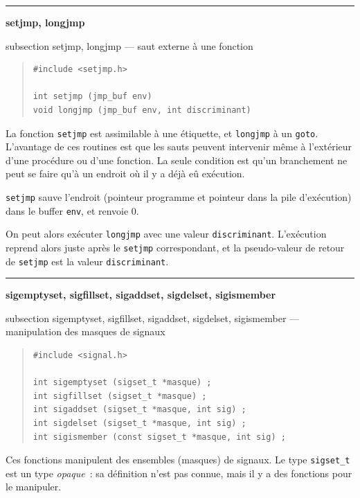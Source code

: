 \documentclass [twoside] {report}
\newcommand {\primitive} [1]
    {
	\phantomsection
	{\large \textbf {#1}}
	\addcontentsline {toc} {subsection} {#1}
    }
\newcommand {\separation}
    {
	\vspace {5mm}
	\nopagebreak
	\hrule
    }
\begin{document}
\separation 
\primitive {setjmp, longjmp} --- saut externe à une fonction

\begin {quote}
\begin {verbatim}
#include <setjmp.h>

int setjmp (jmp_buf env)
void longjmp (jmp_buf env, int discriminant)
\end{verbatim}
\end {quote}

La fonction \texttt {setjmp} est assimilable à une étiquette, et
\texttt {longjmp} à un \texttt {goto}. L'avantage de ces routines est que
les sauts peuvent intervenir même à l'extérieur d'une
procédure ou d'une fonction. La seule condition est qu'un
branchement ne peut se faire qu'à un endroit où il y a déjà
eû exécution.

\texttt {setjmp} sauve l'endroit (pointeur programme et pointeur
dans la pile d'exécution) dans le buffer \texttt {env}, et renvoie
0.

On peut alors exécuter \texttt {longjmp} avec une valeur
\texttt {discriminant}. L'exécution reprend alors juste après le
\texttt {setjmp} correspondant, et la pseudo-valeur de retour de
\texttt {setjmp} est la valeur \texttt {discriminant}.





\separation 
\primitive {sigemptyset, sigfillset, sigaddset, sigdelset, sigismember} ---
manipulation des masques de signaux
    \label {sigsetopts}

\begin {quote}
\begin {verbatim}
#include <signal.h>

int sigemptyset (sigset_t *masque) ;
int sigfillset (sigset_t *masque) ;
int sigaddset (sigset_t *masque, int sig) ;
int sigdelset (sigset_t *masque, int sig) ;
int sigismember (const sigset_t *masque, int sig) ;
\end{verbatim}
\end {quote}

Ces fonctions manipulent des ensembles (masques) de signaux.  Le type
\texttt {sigset\_t} est un type \emph {opaque}~:  sa définition n'est pas
connue, mais il y a des fonctions pour le manipuler.
\end{document}
